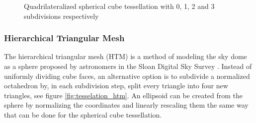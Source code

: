 \begin{figure}
\begin{subfigure}[b]{0.2\textwidth}
    \end{subfigure}
    \caption{Quadrilateralized spherical cube tessellation with 0, 1, 2 and 3 subdivisions respectively}
    \label{fig:tesselation_cube}
\end{figure}

\subsubsection{Hierarchical Triangular Mesh}

The hierarchical triangular mesh (HTM) is a method of modeling the sky dome as a sphere proposed by astronomers in the Sloan Digital Sky Survey \cite{htm}. Instead of uniformly dividing cube faces, an alternative option is to subdivide a normalized octahedron by, in each subdivision step, split every triangle into four new triangles, see figure \ref{fig:tesselation_htm}. An ellipsoid can be created from the sphere by normalizing the coordinates and linearly rescaling them the same way that can be done for the spherical cube tessellation.

